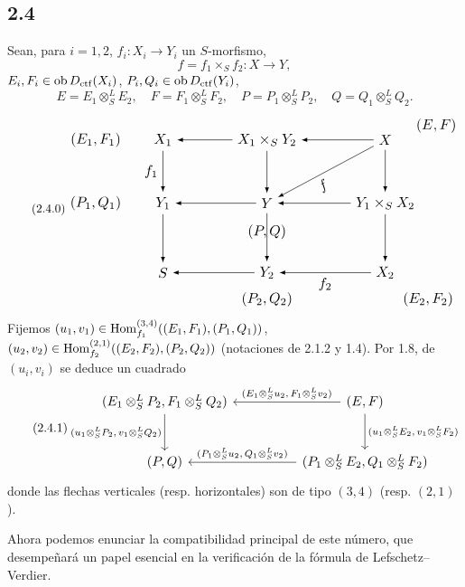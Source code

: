 \subsection*{2.4}
Sean, para $i=1,2$, $f_i:X_i\to Y_i$ un $S$-morfismo,
\[
f=f_1\times_S f_2:X\to Y,
\]
$E_i,F_i\in\operatorname{ob} D_{\mathrm{ctf}}(X_i)$, $P_i,Q_i\in\operatorname{ob} D_{\mathrm{ctf}}(Y_i)$,
\[
E=E_1\otimes^{L}_{S}E_2,
\quad F=F_1\otimes^{L}_{S}F_2,
\quad P=P_1\otimes^{L}_{S}P_2,
\quad Q=Q_1\otimes^{L}_{S}Q_2.
\]
\begin{equation}\tag{2.4.0}
\resizebox{0.96\textwidth}{!}{%
\begin{tikzpicture}[>=latex,baseline=(current bounding box.center)]
\node (EF1) at (-5.2,2.0) {$(E_1,F_1)$};
\node (X1)  at (-3.55,2.0) {$X_1$};
\node (X1Y2) at (-1.0,2.0) {$X_1\times_S Y_2$};
\node (X) at (1.9,2.0) {$X$};
\node (EF) at (3.15,2.35) {$(E,F)$};
\node (PQ1) at (-5.2,0.45) {$(P_1,Q_1)$};
\node (Y1) at (-3.55,0.45) {$Y_1$};
\node (Y) at (-1.0,0.45) {$Y$};
\node (Y1X2) at (1.9,0.45) {$Y_1\times_S X_2$};
\node (S) at (-3.55,-1.25) {$S$};
\node (Y2) at (-1.0,-1.25) {$Y_2$};
\node (X2) at (1.9,-1.25) {$X_2$};
\node (PQ) at (-1.0,-0.25) {$(P,Q)$};
\node (PQ2) at (-1.0,-1.9) {$(P_2,Q_2)$};
\node (EF2) at (2.95,-1.9) {$(E_2,F_2)$};
\draw[->] (X1Y2) -- (X1);
\draw[->] (X) -- (X1Y2);
\draw[->] (X1) -- node[left] {$f_1$} (Y1);
\draw[->] (X1Y2) -- (Y);
\draw[->] (X) -- (Y1X2);
\draw[->] (X) -- node[below,sloped,pos=.58] {$f$} (Y);
\draw[->] (Y) -- (Y1);
\draw[->] (Y1X2) -- (Y);
\draw[->] (Y1) -- (S);
\draw[->] (Y) -- (Y2);
\draw[->] (Y1X2) -- (X2);
\draw[->] (Y2) -- (S);
\draw[->] (X2) -- node[below] {$f_2$} (Y2);
\end{tikzpicture}}
\end{equation}
Fijemos $(u_1,v_1)\in\operatorname{Hom}_{f_1}^{(3,4)}((E_1,F_1),(P_1,Q_1))$, $(u_2,v_2)\in\operatorname{Hom}_{f_2}^{(2,1)}((E_2,F_2),(P_2,Q_2))$ (notaciones de 2.1.2 y 1.4). Por 1.8, de $(u_i,v_i)$ se deduce un cuadrado
\begin{equation}\tag{2.4.1}
\resizebox{0.92\textwidth}{!}{%
\begin{tikzcd}[ampersand replacement=\&,column sep=huge,row sep=large]
(E_1\otimes^L_S P_2,F_1\otimes^L_S Q_2)
  \arrow[d,"{(u_1\otimes^L_S P_2,\,v_1\otimes^L_S Q_2)}"']
  \& (E,F) \arrow[l,"{(E_1\otimes^L_S u_2,\,F_1\otimes^L_S v_2)}"'] \arrow[d,"{(u_1\otimes^L_S E_2,\,v_1\otimes^L_S F_2)}"] \\
(P,Q)
  \& (P_1\otimes^L_S E_2,Q_1\otimes^L_S F_2) \arrow[l,"{(P_1\otimes^L_S u_2,\,Q_1\otimes^L_S v_2)}"']
\end{tikzcd}}
\end{equation}
donde las flechas verticales (resp. horizontales) son de tipo $(3,4)$ (resp. $(2,1)$).

Ahora podemos enunciar la compatibilidad principal de este número, que desempeñará un papel esencial en la verificación de la fórmula de Lefschetz--Verdier.
